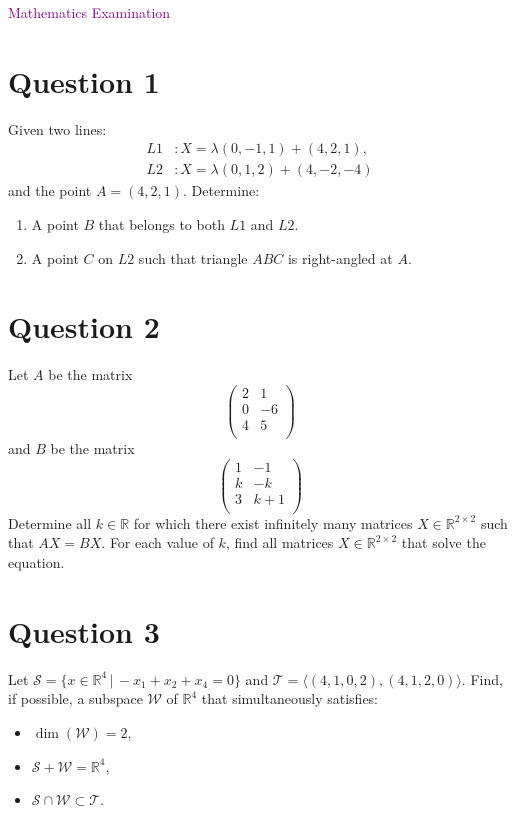 \documentclass[12pt,a4paper]{article}
\begin{document}
	
	\begin{center}
		\colorbox{gray!20}{
			\parbox{0.7\textwidth}{
				\centering \Huge \textcolor{purple}{Mathematics Examination}
			}
		}
	\end{center}
	\vspace{10mm}
	
	\section*{Question 1}
	Given two lines:
	\begin{align*}
		L1 &: X = \lambda(0,-1,1) + (4,2,1), \\
		L2 &: X = \lambda(0,1,2) + (4,-2,-4)
	\end{align*}
	and the point \( A = (4,2,1) \). Determine:
	\begin{enumerate}[label=\textcolor{purple}{\arabic*}.]
		\item A point \( B \) that belongs to both \( L1 \) and \( L2 \).
		\item A point \( C \) on \( L2 \) such that triangle \( ABC \) is right-angled at \( A \).
	\end{enumerate}
	
	\section*{Question 2}
	Let \( A \) be the matrix
	\[
	\begin{pmatrix}
		2 & 1 \\
		0 & -6 \\
		4 & 5 \\
	\end{pmatrix}
	\]
	and \( B \) be the matrix
	\[
	\begin{pmatrix}
		1 & -1 \\
		k & -k \\
		3 & k+1 \\
	\end{pmatrix}
	\]
	Determine all \( k \in \mathbb{R} \) for which there exist infinitely many matrices \( X \in \mathbb{R}^{2 \times 2} \) such that \( AX = BX \). For each value of \( k \), find all matrices \( X \in \mathbb{R}^{2 \times 2} \) that solve the equation.
	
	\section*{Question 3}
	Let \( \mathcal{S} = \{ x \in \mathbb{R}^4 \, | \, -x_1 + x_2 + x_4 = 0 \} \) and \( \mathcal{T} = \langle (4,1,0,2), (4,1,2,0) \rangle \). Find, if possible, a subspace \( \mathcal{W} \) of \( \mathbb{R}^4 \) that simultaneously satisfies:
	\begin{itemize}
		\item \(\dim(\mathcal{W}) = 2\),
		\item \( \mathcal{S} + \mathcal{W} = \mathbb{R}^4 \),
		\item \( \mathcal{S} \cap \mathcal{W} \subset \mathcal{T} \).
	\end{itemize}
	
\end{document}
